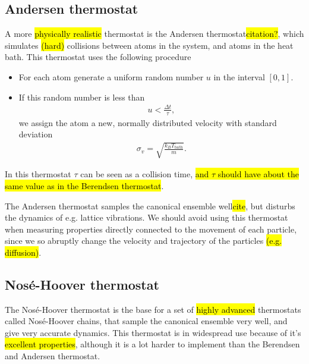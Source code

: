 \subsection{Andersen thermostat}
A more \hl{physically realistic} thermostat is the Andersen thermostat\hl{citation?}, which simulates \hl{(hard)} collisions between atoms in the system, and atoms in the heat bath. This thermostat uses the following procedure
%
\begin{itemize}
    \item For each atom generate a uniform random number $u$ in the interval $[0,1]$.
    \item If this random number is less than
        \begin{align*}
            u < \frac{\Delta t}{\tau},
        \end{align*}
        we assign the atom a new, normally distributed velocity with standard deviation
        \begin{align*}
            \sigma_v = \sqrt{\frac{k_B T_\text{bath}}{m}}.
        \end{align*}
\end{itemize}
%
In this thermostat $\tau$ can be seen as a collision time, \hl{and $\tau$ should have about the same value as in the Berendsen thermostat}.

The Andersen thermostat samples the canonical ensemble well\hl{cite}, but disturbs the dynamics of e.g. lattice vibrations. We should avoid using this thermostat when measuring properties directly connected to the movement of each particle, since we so abruptly change the velocity and trajectory of the particles \hl{(e.g. diffusion)}.

\subsection{Nos\'e-Hoover thermostat}
The Nos\'e-Hoover thermostat is the base for a set of \hl{highly advanced} thermostats called Nos\'e-Hoover chains, that sample the canonical ensemble very well, and give very accurate dynamics.  This thermostat is in widespread use because of it's \hl{excellent properties}, although it is a lot harder to implement than the Berendsen and Andersen thermostat.

